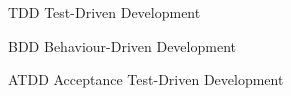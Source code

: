 
\begin{basedescript}{\desclabelstyle{\pushlabel}\desclabelwidth{6em}}
\item[{TDD}] Test-Driven Development%
\item[{BDD}] Behaviour-Driven Development%
\item[{ATDD}] Acceptance Test-Driven Development%
\end{basedescript}


